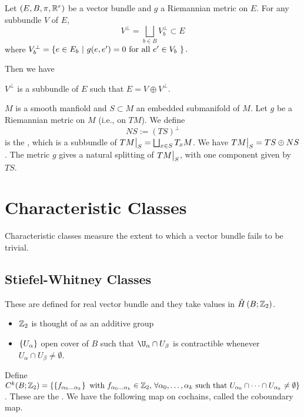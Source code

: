 \documentclass[main.tex]{subfiles}
\begin{document}
  Let $(E, B, \pi, \mathbb{R}^r)$ be a vector bundle and $g$ a Riemannian metric on $E$. For any subbundle $V$ of $E$,
  \[
    V^\perp = \bigsqcup_{b \in B} V_b^\perp \subset E
  \]
  where $V_b^\perp = \left\{ e \in E_b \ | \  g(e, e^\prime) = 0 \text{ for all $e^\prime \in V_b$ } \right\}. $

  Then we have

  \begin{prop}
    $V^\perp$ is a subbundle of $E$ such that $E = V \oplus V^\perp$.
  \end{prop}

  \begin{exmp}
    $M$ is a smooth manfiold and $S \subset M$ an embedded submanifold of $M$. Let $g$ be a Riemannian metric on $M$ (i.e., on $TM$). We define
    \[
    NS := (TS)^\perp
    \]
    is the  , which is a subbundle of $TM\big|_{S} = \bigsqcup_{x \in S} T_xM$. We have $TM\big|_{S} = TS \oplus NS$. The metric $g$ gives a natural splitting of $TM\big|_{S}$, with one component given by $TS$.
  \end{exmp}

  \section{Characteristic Classes}

  Characteristic classes measure the extent to which a vector bundle fails to be trivial.

  \subsection{Stiefel-Whitney Classes}

  These are defined for real vector bundle and they take values in $\check{H}\left( B; \mathbb{Z}_2 \right)$.

  \begin{itemize}
    \item $\mathbb{Z}_2$ is thought of as an additive group
    \item $\left\{U_\alpha\right\}$ open cover of $B$ such that $\U_\alpha \cap U_\beta$ is contractible whenever $U_\alpha \cap U_\beta \neq \emptyset$.
  \end{itemize}

  Define $C^k(B; \mathbb{Z}_2) = \left\{ \left\{ f_{\alpha_0\dots \alpha_k} \right\} \text{ with $f_{\alpha_0\dots\alpha_k} \in \mathbb{Z}_2$, $\forall \alpha_0,\dots, \alpha_k$ such that $U_{\alpha_0} \cap \dots \cap U_{\alpha_k} \neq \emptyset$} \right\}$.
  These are the . We have the following map on cochains, called the coboundary map.
\end{document}
